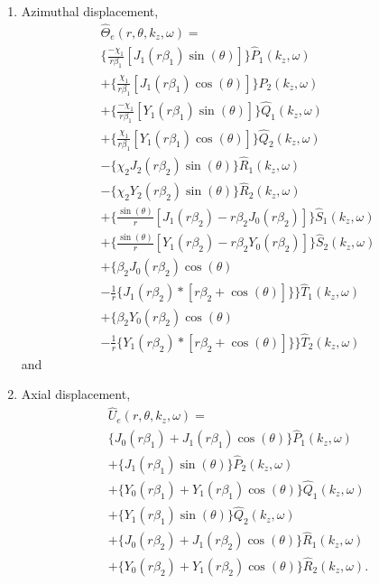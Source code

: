 \documentclass[10pt]{asme2ej}
\begin{document}
\begin{enumerate}[label=\roman*]
    \item Azimuthal displacement,
    \begin{multline}\label{Azimuthal displacement 3d}
    \hat{\Theta}_e(r,\theta,k_z,\omega) =\\ \Bigg\{\frac{-\chi_1}{r\beta_1}[J_1(r\beta_1)\sin(\theta)]\Bigg\}\hat{P}_1(k_z,\omega)\\ + \Bigg\{\frac{\chi_1}{r\beta_1}[J_1(r\beta_1)\cos(\theta)]\Bigg\}\hat{P}_2(k_z,\omega)\\ + \Bigg\{\frac{-\chi_1}{r\beta_1}[Y_1(r\beta_1)\sin(\theta)]\Bigg\}\hat{Q}_1(k_z,\omega)\\ + \Bigg\{\frac{\chi_1}{r\beta_1}[Y_1(r\beta_1)\cos(\theta)]\Bigg\}\hat{Q}_2(k_z,\omega)\\ - \Bigg\{\chi_2J_2(r\beta_2)\sin(\theta)\Bigg\}\hat{R}_1(k_z,\omega)\\ - \Bigg\{\chi_2Y_2(r\beta_2)\sin(\theta)\Bigg\}\hat{R}_2(k_z,\omega)\\ + \Bigg\{\frac{\sin(\theta)}{r}[J_1(r\beta_2)-r\beta_2J_0(r\beta_2)]\Bigg\}\hat{S}_1(k_z,\omega)\\ + \Bigg\{\frac{\sin(\theta)}{r}[Y_1(r\beta_2)-r\beta_2Y_0(r\beta_2)]\Bigg\}\hat{S}_2(k_z,\omega)\\ + \Bigg\{\beta_2J_0(r\beta_2)\cos(\theta)\\-\frac{1}{r}\{J_1(r\beta_2)*[r\beta_2+\cos(\theta)]\}\Bigg\}\hat{T}_1(k_z,\omega)\\ + \Bigg\{\beta_2Y_0(r\beta_2)\cos(\theta)\\-\frac{1}{r}\{Y_1(r\beta_2)*[r\beta_2+\cos(\theta)]\}\Bigg\}\hat{T}_2(k_z,\omega)
    \end{multline}
and
    \item Axial displacement,
    \begin{multline}\label{Axial displacement 3d}    
    \hat{U}_{e}(r,\theta,k_z,\omega) =\\ \bigg\{J_{0}(r\beta_1) + J_{1}(r\beta_1)\cos(\theta)\bigg\}\hat{P}_1(k_z,\omega)\\ + \bigg\{J_{1}(r\beta_1)\sin(\theta)\bigg\}\hat{P}_2(k_z,\omega)\\
    + \bigg\{Y_{0}(r\beta_1) + Y_{1}(r\beta_1)\cos(\theta)\bigg\}\hat{Q}_1(k_z,\omega)\\ + \bigg\{Y_{1}(r\beta_1)\sin(\theta)\bigg\}\hat{Q}_2(k_z,\omega)\\
    + \bigg\{J_{0}(r\beta_2) + J_{1}(r\beta_2)\cos(\theta)\bigg\}\hat{R}_1(k_z,\omega)\\ + \bigg\{Y_{0}(r\beta_2) + Y_{1}(r\beta_2)\cos(\theta)\bigg\}\hat{R}_2(k_z,\omega).
    \end{multline}    
\end{enumerate}
\end{document}
